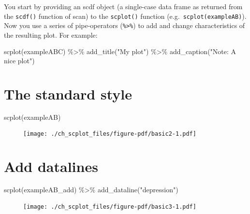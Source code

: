 \documentclass[
  letterpaper,
  DIV=11,
  numbers=noendperiod]{scrreprt}
\newenvironment{Shaded}{\begin{snugshade}}{\end{snugshade}}
\newcommand{\FunctionTok}[1]{\textcolor[rgb]{0.28,0.35,0.67}{#1}}
\newcommand{\NormalTok}[1]{\textcolor[rgb]{0.00,0.23,0.31}{#1}}
\newcommand{\SpecialCharTok}[1]{\textcolor[rgb]{0.37,0.37,0.37}{#1}}
\newcommand{\StringTok}[1]{\textcolor[rgb]{0.13,0.47,0.30}{#1}}
\begin{document}
You start by providing an scdf object (a single-case data frame as
returned from the \texttt{scdf()} function of scan) to the
\texttt{scplot()} function (e.g.~\texttt{scplot(exampleAB)}). Now you
use a series of pipe-operators (\texttt{\%\textgreater{}\%}) to add and
change characteristics of the resulting plot. For example:

\begin{Shaded}
\begin{Highlighting}[]
\FunctionTok{scplot}\NormalTok{(exampleABC) }\SpecialCharTok{\%\textgreater{}\%}
  \FunctionTok{add\_title}\NormalTok{(}\StringTok{"My plot"}\NormalTok{) }\SpecialCharTok{\%\textgreater{}\%}
  \FunctionTok{add\_caption}\NormalTok{(}\StringTok{"Note: A nice plot"}\NormalTok{)}
\end{Highlighting}
\end{Shaded}

\hypertarget{the-standard-style}{%
\section{The standard style}\label{the-standard-style}}

\begin{Shaded}
\begin{Highlighting}[]
\FunctionTok{scplot}\NormalTok{(exampleAB)}
\end{Highlighting}
\end{Shaded}

\begin{figure}[H]

{\centering \texttt{[image: ./ch\_scplot\_files/figure-pdf/basic2-1.pdf]}

}

\end{figure}

\hypertarget{add-datalines}{%
\section{Add datalines}\label{add-datalines}}

\begin{Shaded}
\begin{Highlighting}[]
\FunctionTok{scplot}\NormalTok{(exampleAB\_add) }\SpecialCharTok{\%\textgreater{}\%}
  \FunctionTok{add\_dataline}\NormalTok{(}\StringTok{"depression"}\NormalTok{)}
\end{Highlighting}
\end{Shaded}

\begin{figure}[H]

{\centering \texttt{[image: ./ch\_scplot\_files/figure-pdf/basic3-1.pdf]}

}

\end{figure}
\end{document}
